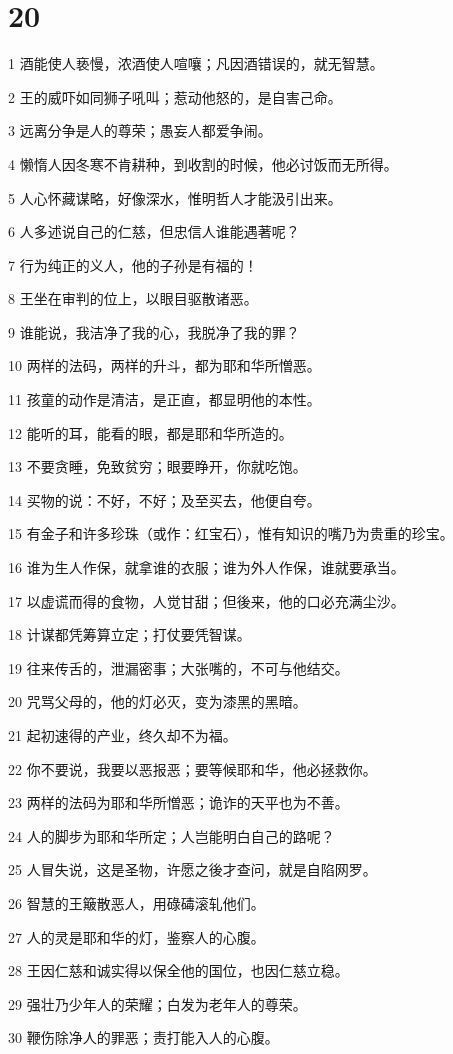 \chapter{20}

\par 1 酒能使人亵慢，浓酒使人喧嚷；凡因酒错误的，就无智慧。
\par 2 王的威吓如同狮子吼叫；惹动他怒的，是自害己命。
\par 3 远离分争是人的尊荣；愚妄人都爱争闹。
\par 4 懒惰人因冬寒不肯耕种，到收割的时候，他必讨饭而无所得。
\par 5 人心怀藏谋略，好像深水，惟明哲人才能汲引出来。
\par 6 人多述说自己的仁慈，但忠信人谁能遇著呢？
\par 7 行为纯正的义人，他的子孙是有福的！
\par 8 王坐在审判的位上，以眼目驱散诸恶。
\par 9 谁能说，我洁净了我的心，我脱净了我的罪？
\par 10 两样的法码，两样的升斗，都为耶和华所憎恶。
\par 11 孩童的动作是清洁，是正直，都显明他的本性。
\par 12 能听的耳，能看的眼，都是耶和华所造的。
\par 13 不要贪睡，免致贫穷；眼要睁开，你就吃饱。
\par 14 买物的说：不好，不好；及至买去，他便自夸。
\par 15 有金子和许多珍珠（或作：红宝石），惟有知识的嘴乃为贵重的珍宝。
\par 16 谁为生人作保，就拿谁的衣服；谁为外人作保，谁就要承当。
\par 17 以虚谎而得的食物，人觉甘甜；但後来，他的口必充满尘沙。
\par 18 计谋都凭筹算立定；打仗要凭智谋。
\par 19 往来传舌的，泄漏密事；大张嘴的，不可与他结交。
\par 20 咒骂父母的，他的灯必灭，变为漆黑的黑暗。
\par 21 起初速得的产业，终久却不为福。
\par 22 你不要说，我要以恶报恶；要等候耶和华，他必拯救你。
\par 23 两样的法码为耶和华所憎恶；诡诈的天平也为不善。
\par 24 人的脚步为耶和华所定；人岂能明白自己的路呢？
\par 25 人冒失说，这是圣物，许愿之後才查问，就是自陷网罗。
\par 26 智慧的王簸散恶人，用碌碡滚轧他们。
\par 27 人的灵是耶和华的灯，鉴察人的心腹。
\par 28 王因仁慈和诚实得以保全他的国位，也因仁慈立稳。
\par 29 强壮乃少年人的荣耀；白发为老年人的尊荣。
\par 30 鞭伤除净人的罪恶；责打能入人的心腹。

